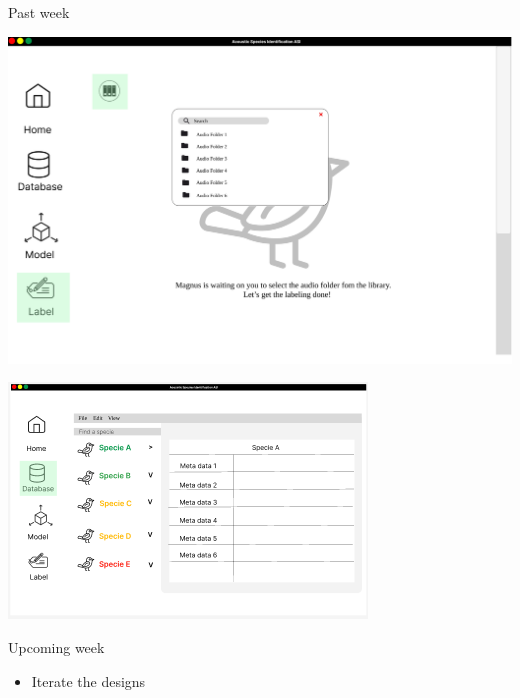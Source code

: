 \begin{frame}{Past week} 
    \begin{minipage}[b]{0.45\textwidth}
        \centering
        \includegraphics[width=\textwidth]{sampleui4.png}  
    \end{minipage}%
    \hspace{0.05\textwidth}
    \begin{minipage}[b]{0.45\textwidth}
        \centering
        \includegraphics[width=\textwidth]{sampleui5.png}  
    \end{minipage}
\end{frame}

\begin{frame}{Upcoming week} 
    \begin{itemize}
        \item Iterate the designs 
    \end{itemize}  
\end{frame}


